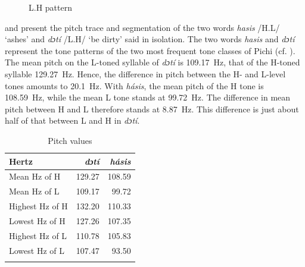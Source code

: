 \begin{figure}[b]
\caption{L.H pattern}
\label{fig:key:3.6}  
\end{figure}

 and   present the pitch trace and segmentation of the two words \textit{hasis} /H.L/ ‘ashes’ and \textit{dɔtí} /L.H/ ‘be dirty’ said in isolation. The two words \textit{hasis} and \textit{dɔtí} represent the tone patterns of the two most frequent tone classes of Pichi (cf. ). The mean pitch on the L-toned syllable of \textit{dɔtí} is 109.17~Hz, that of the H-toned syllable 129.27~Hz. Hence, the difference in pitch between the H- and L-level tones amounts to 20.1~Hz. With \textit{hásis}, the mean pitch of the H tone is 108.59~Hz, while the mean L tone stands at 99.72~Hz. The difference in mean pitch between H and L therefore stands at 8.87~Hz. This difference is just about half of that between L and H in \textit{dɔtí}.

\begin{table} 
\caption{Pitch values}
\label{tab:key:3.1} 
\begin{tabularx}{.5\textwidth}{Xrr}
\lsptoprule
Hertz & \itshape dɔtí & \itshape hásis\\
\midrule
Mean Hz of H    & 129.27 & 108.59\\
Mean Hz of L    & 109.17 & 99.72\\
Highest Hz of H & 132.20 & 110.33\\
Lowest Hz of H  & 127.26 & 107.35\\
Highest Hz of L & 110.78 & 105.83\\
Lowest Hz of L  & 107.47 & 93.50\\
\lspbottomrule
\end{tabularx}
\end{table}

